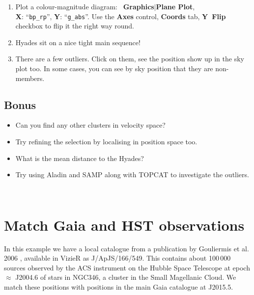 \documentclass{article}
\newcommand{\buttimg}[1]
           {\mbox{\vtop{\vskip-2ex\hbox{\texttt{[image: \#1]}}}}}
\newcommand{\winfig}[2]
           {\vspace*{-0.5cm}
            \hspace*{0.5cm}\mbox{\vtop{\hbox{\texttt{[image: \#2]}}}}}
\newcommand{\lab}[1]{{\bf #1}}
\newcommand{\mb}[3]{\buttimg{#1}~\lab{#2}$\mid$\lab{#3}}
\newcommand{\entry}[2]{\lab{#1}: ``{\tt #2}''}
\begin{document}
\begin{minipage}[t]{11cm}
  \raggedright
  \begin{enumerate}
  \item Plot a colour-magnitude diagram:
        \mb{planeplot_button.png}{Graphics}{Plane Plot}, \\
        \entry{X}{bp\_rp}, \entry{Y}{g\_abs}.
        Use the \buttimg{axes_button.png} \lab{Axes} control,
        \lab{Coords} tab, \lab{Y~Flip} checkbox
        to flip it the right way round.
  \item Hyades sit on a nice tight main sequence!
  \item There are a few outliers.
        Click on them, see the position show up in the sky plot too.
        In some cases, you can see by sky position that they are non-members.
  \end{enumerate}

  \subsection*{Bonus}
  \begin{itemize}
    \item Can you find any other clusters in velocity space?
    \item Try refining the selection by localising in position space too.
    \item What is the mean distance to the Hyades?
    \item Try using Aladin and SAMP along with TOPCAT
          to investigate the outliers.
  \end{itemize}
\end{minipage}
\begin{minipage}[t]{8cm}
  \winfig{width=8cm}{hy_cmd.png}
  \\[1cm]
  \winfig{width=8cm}{hy_sky.png}
\end{minipage}

\newpage
\section{Match Gaia and HST observations}

In this example we have a local catalogue from a publication
by Gouliermis et al. 2006 \cite{gouliermis},
available in VizieR as J/ApJS/166/549.
This contains about 100\,000 sources observed by the ACS instrument
on the Hubble Space Telescope at epoch $\approx$ J2004.6
of stars in NGC346, a cluster in the Small Magellanic Cloud.
We match these positions with positions in the main Gaia catalogue at
J2015.5.
\end{document}
